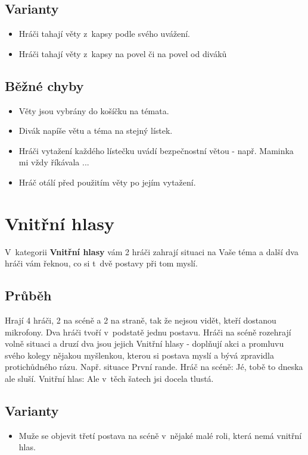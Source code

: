  
\subsection{ Varianty } \begin{itemize}
\item Hráči tahají věty z~kapsy podle svého uvážení.
\item Hráči tahají věty z~kapsy na povel  či na povel od diváků  
\end{itemize}
 
 
\subsection{ Běžné chyby } \begin{itemize}
\item Věty jsou vybrány do košíčku na témata.
\item Divák napíše větu a téma na stejný lístek.
\item Hráči vytažení každého lístečku uvádí bezpečnostní větou - např. Maminka mi vždy říkávala ...
\item Hráč otálí před použitím věty po jejím vytažení.
\end{itemize}
 
 
 
 
 
\needspace{5cm} \section{Vnitřní hlasy} \label{vnitřní hlasy}  
 
 
V~kategorii \textbf{Vnitřní hlasy} vám 2 hráči zahrají situaci na Vaše téma a další dva hráči vám řeknou, co si t\ dvě postavy při tom myslí. 
 
 
\subsection{Průběh} Hrají 4 hráči, 2 na scéně a 2 na straně, tak že nejsou vidět, kteří dostanou mikrofony.  Dva hráči tvoří v~podstatě jednu postavu. Hráči na scéně rozehrají volně situaci a druzí dva jsou jejich Vnitřní hlasy - doplňují akci a promluvu svého kolegy nějakou myšlenkou, kterou si postava myslí a bývá zpravidla protichůdného rázu. Např. situace První rande. Hráč na scéně: Jé, tobě to dneska ale sluší. Vnitřní hlas: Ale v~těch šatech jsi docela tlustá. 
 
\subsection{ Varianty } \begin{itemize}
\item Muže se objevit třetí postava na scéně v~nějaké malé roli, která nemá vnitřní hlas.
\end{itemize}
 
